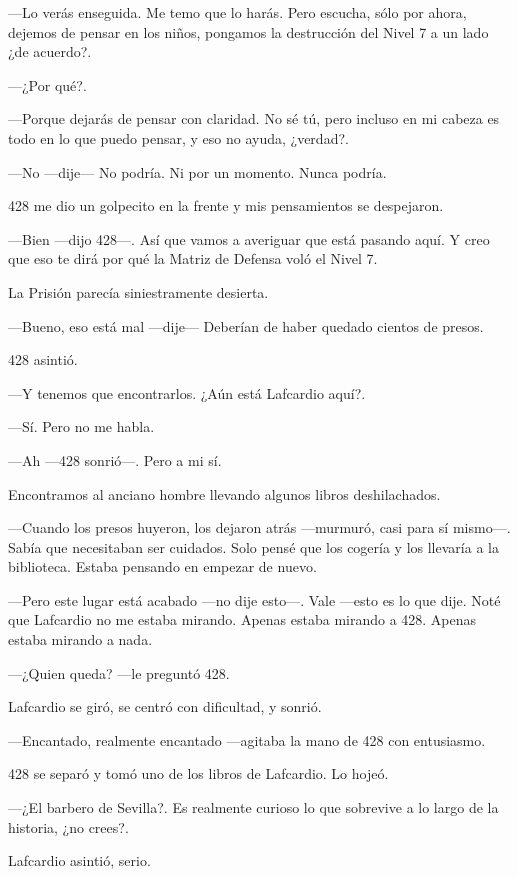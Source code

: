 ---Lo verás enseguida. Me temo que lo harás. Pero escucha, sólo por
ahora, dejemos de pensar en los niños, pongamos la destrucción del Nivel
7 a un lado ¿de acuerdo?.

---¿Por qué?.

---Porque dejarás de pensar con claridad. No sé tú, pero incluso en mi
cabeza es todo en lo que puedo pensar, y eso no ayuda, ¿verdad?.

---No ---dije--- No podría. Ni por un momento. Nunca podría.

428 me dio un golpecito en la frente y mis pensamientos se despejaron.

---Bien ---dijo 428---. Así que vamos a averiguar que está pasando aquí.
Y creo que eso te dirá por qué la Matriz de Defensa voló el Nivel 7.

La Prisión parecía siniestramente desierta.

---Bueno, eso está mal ---dije--- Deberían de haber quedado cientos de
presos.

428 asintió.

---Y tenemos que encontrarlos. ¿Aún está Lafcardio aquí?.

---Sí. Pero no me habla.

---Ah ---428 sonrió---. Pero a mi sí.

Encontramos al anciano hombre llevando algunos libros deshilachados.

---Cuando los presos huyeron, los dejaron atrás ---murmuró, casi para sí
mismo---. Sabía que necesitaban ser cuidados. Solo pensé que los cogería
y los llevaría a la biblioteca. Estaba pensando en empezar de nuevo.

---Pero este lugar está acabado ---no dije esto---. Vale ---esto es lo
que dije. Noté que Lafcardio no me estaba mirando. Apenas estaba mirando
a 428. Apenas estaba mirando a nada.

---¿Quien queda? ---le preguntó 428.

Lafcardio se giró, se centró con dificultad, y sonrió.

---Encantado, realmente encantado ---agitaba la mano de 428 con
entusiasmo.

428 se separó y tomó uno de los libros de Lafcardio. Lo hojeó.

---¿El barbero de Sevilla?. Es realmente curioso lo que sobrevive a lo
largo de la historia, ¿no crees?.

Lafcardio asintió, serio.

